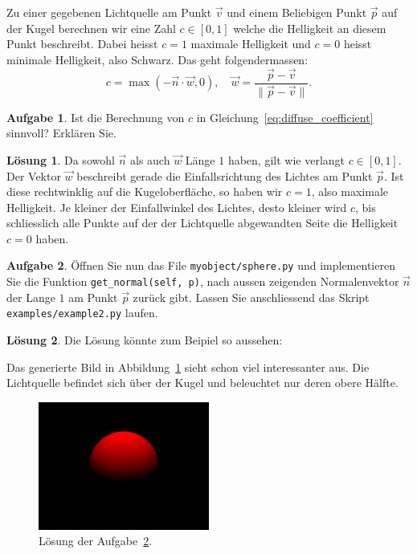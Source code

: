 \documentclass[12pt,a4paper]{article}
\theoremstyle{definition}
\newtheorem{aufgabe}{Aufgabe}
\theoremstyle{definition}
\newtheorem*{losung*}{Lösung}
\begin{document}
	Zu einer gegebenen Lichtquelle am Punkt $\vec{v}$ und einem Beliebigen Punkt $\vec{p}$ auf der Kugel berechnen wir eine Zahl $c\in\left[0,1\right]$ welche die Helligkeit an diesem Punkt beschreibt.
	Dabei heisst $c=1$ maximale Helligkeit und $c=0$ heisst minimale Helligkeit, also Schwarz.
	Das geht folgendermassen:
	\begin{equation}\label{eq:diffuse_coefficient}
		c=\max\left(-\vec{n}\cdot\vec{w}, 0\right),\quad
		\vec{w}=\frac{\vec{p}-\vec{v}}{\lVert\vec{p}-\vec{v}\rVert}.
	\end{equation}
	\begin{aufgabe}\label{aufg:diffuse_coefficient}
		Ist die Berechnung von $c$ in Gleichung~\eqref{eq:diffuse_coefficient} sinnvoll? Erklären Sie.
	\end{aufgabe}
	\begin{losung*}
		Da sowohl $\vec{n}$ als auch $\vec{w}$ Länge $1$ haben, gilt wie verlangt $c\in\left[0,1\right]$.
		Der Vektor $\vec{w}$ beschreibt gerade die Einfallsrichtung des Lichtes am Punkt $\vec{p}$.
		Ist diese rechtwinklig auf die Kugeloberfläche, so haben wir $c=1$, also maximale Helligkeit.
		Je kleiner der Einfallwinkel des Lichtes, desto kleiner wird $c$, bis schliesslich alle  Punkte auf der der Lichtquelle abgewandten Seite die Helligkeit $c=0$ haben.
	\end{losung*}
	\begin{aufgabe}\label{aufg:diffuse_implementation}
		Öffnen Sie nun das File \texttt{myobject/sphere.py} und implementieren Sie die Funktion \texttt{get\_normal(self, p)}, nach aussen zeigenden Normalenvektor $\vec{n}$ der Lange $1$ am Punkt $\vec{p}$ zurück gibt.
		Lassen Sie anschliessend das Skript \texttt{examples/example2.py} laufen.
	\end{aufgabe}
	\begin{losung*}
		Die Lösung könnte zum Beipiel so aussehen:
		
		Das generierte Bild in Abbildung~\ref{fig:solution_diffuse} sieht schon viel interessanter aus.
		Die Lichtquelle befindet sich über der Kugel und beleuchtet nur deren obere Hälfte.
		\begin{figure}[ht]
			\centering
			\includegraphics[width=0.5\textwidth]{images/example2.png}
			\caption{Lösung der Aufgabe~\ref{aufg:diffuse_implementation}.}
			\label{fig:solution_diffuse}
		\end{figure}
	\end{losung*}
\end{document}
